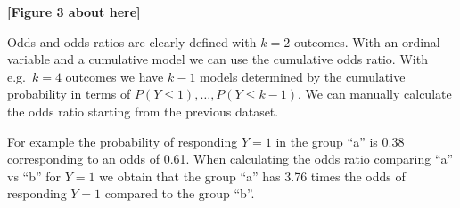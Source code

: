 \documentclass[
  man, mask,floatsintext]{apa6}
\newenvironment{Shaded}{\begin{snugshade}}{\end{snugshade}}
\newcommand{\CommentTok}[1]{\textcolor[rgb]{0.56,0.35,0.01}{\textit{#1}}}
\newcommand{\ControlFlowTok}[1]{\textcolor[rgb]{0.13,0.29,0.53}{\textbf{#1}}}
\newcommand{\DecValTok}[1]{\textcolor[rgb]{0.00,0.00,0.81}{#1}}
\newcommand{\FunctionTok}[1]{\textcolor[rgb]{0.13,0.29,0.53}{\textbf{#1}}}
\newcommand{\NormalTok}[1]{#1}
\newcommand{\OtherTok}[1]{\textcolor[rgb]{0.56,0.35,0.01}{#1}}
\newcommand{\SpecialCharTok}[1]{\textcolor[rgb]{0.81,0.36,0.00}{\textbf{#1}}}
\newcommand{\StringTok}[1]{\textcolor[rgb]{0.31,0.60,0.02}{#1}}
\begin{document}
\begin{center}\textbf{[Figure 3 about here]} \end{center}

\normalsize

Odds and odds ratios are clearly defined with \(k = 2\) outcomes. With an ordinal variable and a cumulative model we can use the cumulative odds ratio. With e.g.~\(k = 4\) outcomes we have \(k - 1\) models determined by the cumulative probability in terms of \(P(Y \leq 1), \dots, P(Y \leq k - 1)\). We can manually calculate the odds ratio starting from the previous dataset.

\scriptsize

\begin{Shaded}
\end{Shaded}

\normalsize

For example the probability of responding \(Y = 1\) in the group ``a'' is 0.38 corresponding to an odds of 0.61. When calculating the odds ratio comparing ``a'' vs ``b'' for \(Y = 1\) we obtain that the group ``a'' has 3.76 times the odds of responding \(Y = 1\) compared to the group ``b''.
\end{document}

